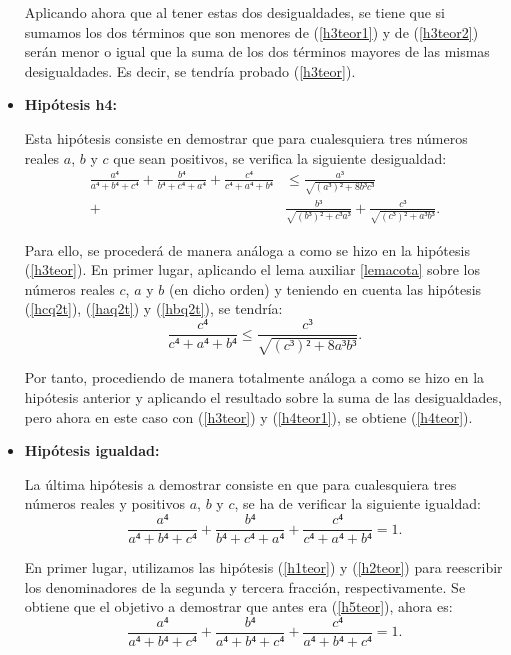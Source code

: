 \begin{demostracion}
\begin{itemize}
    Aplicando ahora que al tener estas dos desigualdades, se tiene que si
    sumamos los dos términos que son menores de (\ref{h3teor1}) y de
    (\ref{h3teor2}) serán menor o igual que la suma de los dos términos
    mayores de las mismas desigualdades. Es decir, se tendría probado
    (\ref{h3teor}).

  \item \textbf{Hipótesis h4:}

    Esta hipótesis consiste en demostrar que para cualesquiera tres números
    reales \(a\), \(b\) y \(c\) que sean positivos, se verifica la
    siguiente desigualdad:
    \begin{align*}\label{h4teor}\tag{h4}
      \frac{a⁴}{a⁴+b⁴+c⁴}+\frac{b⁴}{b⁴+c⁴+a⁴}+\frac{c⁴}{c⁴+a⁴+b⁴}&≤
      \frac{a³}{\sqrt{(a³)²+8b³c³}}\\+&\frac{b³}{\sqrt{(b³)²+c³a³}}+
      \frac{c³}{\sqrt{(c³)²+a³b³}}.
    \end{align*}

    Para ello, se procederá de manera análoga a como se hizo en la
    hipótesis (\ref{h3teor}). En primer lugar, aplicando el lema auxiliar
    \ref{lemacota} sobre los números reales \(c\), \(a\) y \(b\) (en dicho
    orden) y teniendo en cuenta las hipótesis (\ref{hcq2t}), (\ref{haq2t})
    y (\ref{hbq2t}), se tendría:
    \begin{equation}\label{h4teor1}
      \frac{c⁴}{c⁴+a⁴+b⁴}≤
      \frac{c³}{\sqrt{(c³)²+8a³b³}}.
    \end{equation}

    Por tanto, procediendo de manera totalmente análoga a como se hizo en
    la hipótesis anterior y aplicando el resultado sobre la suma de las
    desigualdades, pero ahora en este caso con (\ref{h3teor}) y
    (\ref{h4teor1}), se obtiene (\ref{h4teor}).

  \item \textbf{Hipótesis igualdad:}

    La última hipótesis a demostrar consiste en que para cualesquiera
    tres números reales y positivos \(a\), \(b\) y \(c\), se ha de
    verificar la siguiente igualdad:
    \begin{equation}\label{h5teor}\tag{igualdad}
      \frac{a⁴}{a⁴+b⁴+c⁴}+\frac{b⁴}{b⁴+c⁴+a⁴}+\frac{c⁴}{c⁴+a⁴+b⁴}=1.
    \end{equation}

    En primer lugar, utilizamos las hipótesis (\ref{h1teor}) y
    (\ref{h2teor}) para reescribir los denominadores de la segunda y
    tercera fracción, respectivamente. Se obtiene que el objetivo a
    demostrar que antes era (\ref{h5teor}), ahora es:
    \begin{equation}\label{h5teor1}
      \frac{a⁴}{a⁴+b⁴+c⁴}+\frac{b⁴}{a⁴+b⁴+c⁴}+\frac{c⁴}{a⁴+b⁴+c⁴}=1.
    \end{equation}


\end{itemize}
\end{demostracion}
